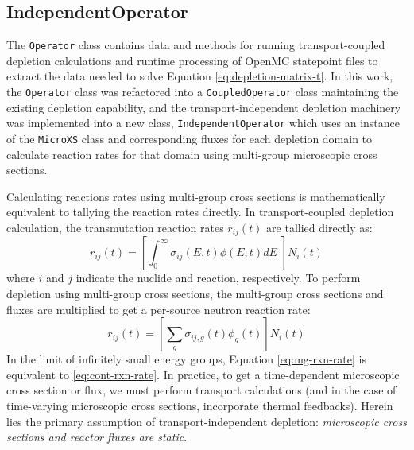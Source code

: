     \subsection{IndependentOperator}
        The \verb.Operator. class contains data and methods for running
        transport-coupled depletion calculations and runtime
        processing of OpenMC statepoint files to extract the data needed to
        solve Equation \ref{eq:depletion-matrix-t}. In this work, the
        \verb.Operator. class was refactored into a \verb.CoupledOperator.
        class maintaining the existing depletion capability, and the
        transport-independent depletion machinery was implemented into a new
        class, \verb.IndependentOperator. which uses an instance of the
        \verb.MicroXS. class and corresponding fluxes for each depletion domain
        to calculate reaction rates for that domain using multi-group microscopic
        cross sections.

        Calculating reactions rates using multi-group cross sections is
        mathematically equivalent to tallying the reaction rates directly. In
        transport-coupled depletion calculation, the transmutation reaction
        rates $r_{ij}(t)$ are tallied directly as:
        \begin{equation}
            \label{eq:cont-rxn-rate}
            r_{ij}(t) = \left[\int_0^\infty \sigma_{ij}(E,t) \phi(E,t) dE \; \right]
            N_{i}(t)
        \end{equation}
        where $i$ and $j$ indicate the nuclide and reaction, respectively.
            To perform depletion using multi-group cross sections, the multi-group
        cross sections and fluxes are multiplied to get a per-source neutron
        reaction rate:
        \begin{equation}
            \label{eq:mg-rxn-rate}
            r_{ij}(t) = \left[\sum_{g} \sigma_{ij,g}(t) \phi_{g}(t) \right]
            N_{i}(t) 
        \end{equation}
        In the limit of infinitely small energy groups, Equation
        \ref{eq:mg-rxn-rate} is equivalent to \ref{eq:cont-rxn-rate}. In
        practice, to get a time-dependent microscopic cross section or flux, we
        must perform transport calculations (and in the case of time-varying
        microscopic cross sections, incorporate thermal feedbacks). Herein lies
        the primary assumption of transport-independent depletion: {\it
        microscopic cross sections and reactor fluxes are static}.

